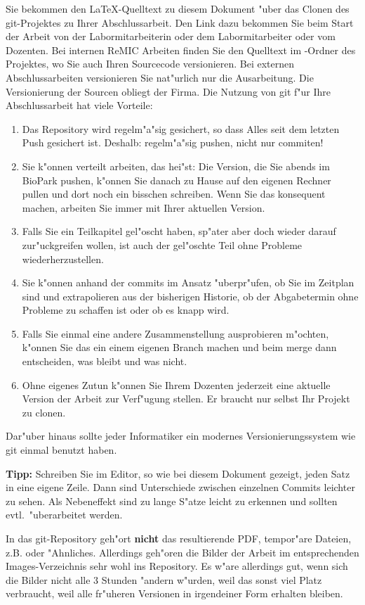 \documentclass[12pt,a4paper,headinclude,twoside, plainheadsepline, open=right,numbers=noenddot]{scrreprt}
\begin{document}
Sie bekommen den \LaTeX -Quelltext zu diesem Dokument "uber das Clonen des git-Projektes zu Ihrer Abschlussarbeit.
Den Link dazu bekommen Sie beim Start der Arbeit von der Labormitarbeiterin oder dem Labormitarbeiter oder vom Dozenten.
Bei internen ReMIC Arbeiten finden Sie den Quelltext im -Ordner des Projektes, wo Sie auch Ihren Sourcecode versionieren.
Bei externen Abschlussarbeiten versionieren Sie nat"urlich nur die Ausarbeitung.
Die Versionierung der Sourcen obliegt der Firma.
Die Nutzung von git f"ur Ihre Abschlussarbeit hat viele Vorteile:
\begin{enumerate}
\item Das Repository wird regelm"a"sig gesichert, so dass Alles seit dem letzten Push gesichert ist.
Deshalb: regelm"a"sig pushen, nicht nur commiten!
\item Sie k"onnen verteilt arbeiten, das hei"st:
Die Version, die Sie abends im BioPark pushen, k"onnen Sie danach zu Hause auf den eigenen Rechner pullen und dort noch ein bisschen schreiben.
Wenn Sie das konsequent machen, arbeiten Sie immer mit Ihrer aktuellen Version.
\item Falls Sie ein Teilkapitel gel"oscht haben, sp"ater aber doch wieder darauf zur"uckgreifen wollen, ist auch der gel"oschte Teil ohne Probleme wiederherzustellen.
\item Sie k"onnen anhand der commits im Ansatz "uberpr"ufen, ob Sie im Zeitplan sind und extrapolieren aus der bisherigen Historie, ob der Abgabetermin ohne Probleme zu schaffen ist oder ob es knapp wird.
\item Falls Sie einmal eine andere Zusammenstellung ausprobieren m"ochten, k"onnen Sie das ein einem eigenen Branch machen und beim merge dann entscheiden, was bleibt und was nicht.
\item Ohne eigenes Zutun k"onnen Sie Ihrem Dozenten jederzeit eine aktuelle Version der Arbeit zur Verf"ugung stellen.
Er braucht nur selbst Ihr Projekt zu clonen.
\end{enumerate}
Dar"uber hinaus sollte jeder Informatiker ein modernes Versionierungssystem wie git einmal benutzt haben.

\textbf{Tipp:} Schreiben Sie im Editor, so wie bei diesem Dokument gezeigt, jeden Satz in eine eigene Zeile.
Dann sind Unterschiede zwischen einzelnen Commits leichter zu sehen.
Als Nebeneffekt sind zu lange S"atze leicht zu erkennen und sollten evtl.~"uberarbeitet werden.

In das git-Repository geh"ort \textbf{nicht} das resultierende PDF, tempor"are Dateien, z.B.  oder "Ahnliches.
Allerdings geh"oren die Bilder der Arbeit im entsprechenden Images-Verzeichnis sehr wohl ins Repository.
Es w"are allerdings gut, wenn sich die Bilder nicht alle 3 Stunden "andern w"urden, weil das sonst viel Platz verbraucht, weil alle fr"uheren Versionen in irgendeiner Form erhalten bleiben.
\end{document}
